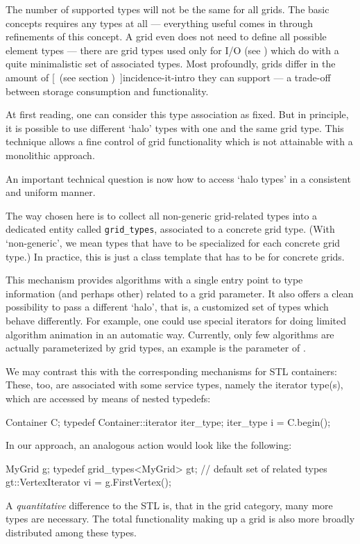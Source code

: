   The number of supported types  will not be the same for all grids.
  The basic  concepts requires any types at all
  --- everything useful comes in through refinements of this concept.
  A grid even does not need to define all possible element types ---
  there are grid types used only for I/O 
  (see )
  which do with a quite
  minimalistic set of associated types.
  Most profoundly, grids differ in the amount of
  [~(see section \Ref)~]{incidence-it-intro}
  they can support --- a trade-off between storage consumption and functionality.


  At first reading, 
  one can consider this type association as fixed.
  But in principle, it is possible to use different `halo' types 
  with one and the same grid type.
  This technique allows a fine control of grid functionality
  which is not attainable with a monolithic approach.

  \label{intro-grid-types}
  An important  technical question is now  
  how to access `halo types' in a consistent and uniform manner. 

  The way chosen here is to collect all non-generic grid-related types into
  a dedicated entity called {\tt grid\_types},
   associated to a concrete grid type.
  (With `non-generic', we mean types that have to be specialized for each
  concrete grid type.) 
  In practice, this is just a class template that has to be
   for concrete grids.

  This mechanism provides algorithms with a single entry point to 
  type information (and perhaps other) related to a grid parameter.
  It also offers a clean possibility to pass a different `halo',
  that is, a customized set of types which behave differently.
  For example, one could use special iterators for doing 
  limited algorithm animation in an automatic way.
  Currently, only few algorithms are actually parameterized by 
  grid types, an example is the  parameter of 
  .
  
  We may contrast this  with the corresponding mechanisms for STL containers:
  These, too, are associated with some service types, namely the 
  iterator type(s), which are accessed by means of nested typedefs:
  \begin{example}
    Container C;
    typedef Container::iterator iter_type;
    iter_type i = C.begin();
  \end{example}
  In our approach, an analogous action would look like the following:
  \begin{example}
    MyGrid g;
    typedef grid_types<MyGrid> gt; // default set of related types
    gt::VertexIterator vi = g.FirstVertex();
  \end{example}
  A {\em quantitative\/} difference to the STL is, that in the grid category,
  many more types are necessary. 
  The total functionality making up a grid is also more broadly
  distributed among these types.

